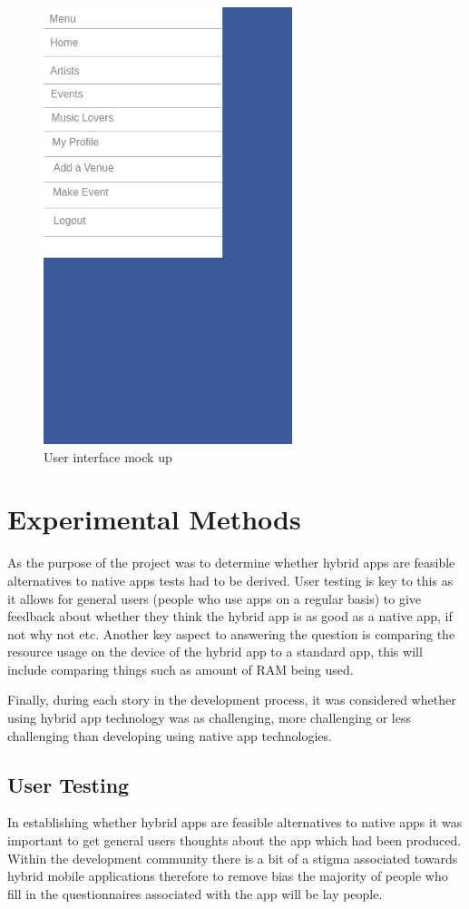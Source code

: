 \begin{center}
\begin{figure}[H]
\includegraphics[scale=0.5]{images/ui3}
\caption{User interface mock up}
\end{figure}
\end{center}

\section{Experimental Methods}
As the purpose of the project was to determine whether hybrid apps are feasible alternatives to native apps tests had to be derived. User testing is key to this as it allows for general users (people who use apps on a regular basis) to give feedback about whether they think the hybrid app is as good as a native app, if not why not etc. Another key aspect to answering the question is comparing the resource usage on the device of the hybrid app to a standard app, this will include comparing things such as amount of RAM being used.

Finally, during each story in the development process, it was considered whether using hybrid app technology was as challenging, more challenging or less challenging than developing using native app technologies.

\subsection{User Testing}
In establishing whether hybrid apps are feasible alternatives to native apps it was important to get general users thoughts about the app which had been produced. Within the development community there is a bit of a stigma associated towards hybrid mobile applications therefore to remove bias the majority of people who fill in the questionnaires associated with the app will be lay people.

